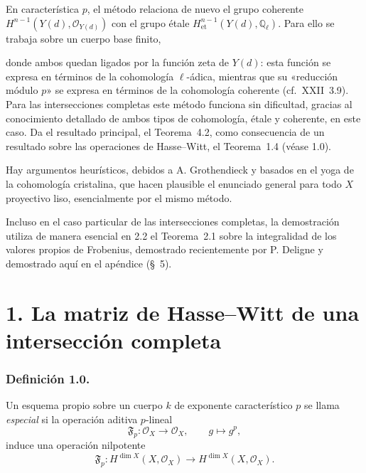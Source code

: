 En característica $p$, el método relaciona de nuevo el grupo coherente
$H^{n-1}(Y(d),\mathcal O_{Y(d)})$ con el grupo étale
$H^{n-1}_{\mathrm{et}}(Y(d),\mathbb Q_\ell)$. Para ello se trabaja sobre
un cuerpo base finito,

\pageoriginale

donde ambos quedan ligados por la función zeta de $Y(d)$: esta función se
expresa en términos de la cohomología $\ell$-ádica, mientras que su
«reducción módulo $p$» se expresa en términos de la cohomología coherente
(cf.~XXII~3.9). Para las intersecciones completas este método funciona sin
dificultad, gracias al conocimiento detallado de ambos tipos de
cohomología, étale y coherente, en este caso. Da el resultado principal,
el Teorema~4.2, como consecuencia de un resultado sobre las operaciones de
Hasse--Witt, el Teorema~1.4 (véase 1.0).

Hay argumentos heurísticos, debidos a A. Grothendieck y basados en el yoga
de la cohomología cristalina, que hacen plausible el enunciado general
para todo $X$ proyectivo liso, esencialmente por el mismo método.

Incluso en el caso particular de las intersecciones completas, la
demostración utiliza de manera esencial en 2.2 el Teorema~2.1 sobre la
integralidad de los valores propios de Frobenius, demostrado recientemente
por P. Deligne y demostrado aquí en el apéndice (\S~5).

\section*{1. La matriz de Hasse--Witt de una intersección completa}

\subsubsection*{Definición 1.0.}
Un esquema propio sobre un cuerpo $k$ de exponente característico $p$ se
llama \emph{especial} si la operación aditiva $p$-lineal
\begin{equation}\tag{1.0.1}
\mathfrak F_p:\mathcal O_X\longrightarrow\mathcal O_X,
\qquad g\longmapsto g^p,
\end{equation}
induce una operación nilpotente
\begin{equation}\tag{1.0.2}
\mathfrak F_p:H^{\dim X}(X,\mathcal O_X)
\longrightarrow H^{\dim X}(X,\mathcal O_X).
\end{equation}

\pageoriginale

